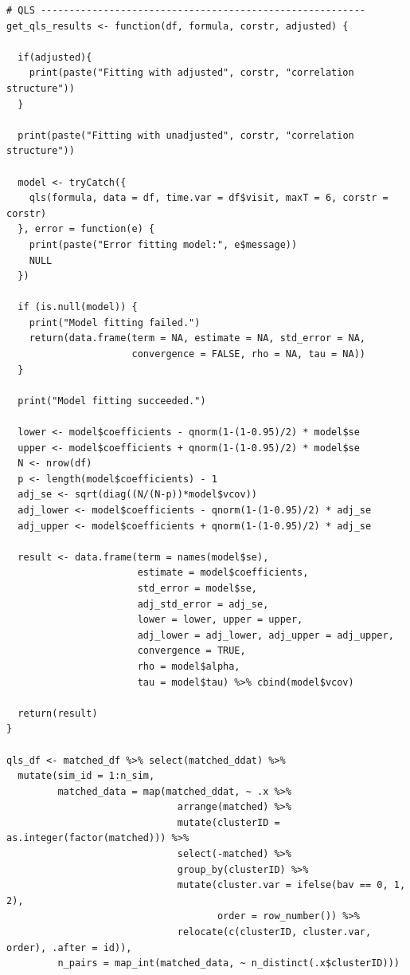 \documentclass[
]{aft}
\begin{document}
\begin{verbatim}
# QLS ---------------------------------------------------------
get_qls_results <- function(df, formula, corstr, adjusted) {
  
  if(adjusted){
    print(paste("Fitting with adjusted", corstr, "correlation structure"))
  }
  
  print(paste("Fitting with unadjusted", corstr, "correlation structure"))
  
  model <- tryCatch({
    qls(formula, data = df, time.var = df$visit, maxT = 6, corstr = corstr)
  }, error = function(e) {
    print(paste("Error fitting model:", e$message))
    NULL
  })
  
  if (is.null(model)) {
    print("Model fitting failed.")
    return(data.frame(term = NA, estimate = NA, std_error = NA, 
                      convergence = FALSE, rho = NA, tau = NA))
  }
  
  print("Model fitting succeeded.")
  
  lower <- model$coefficients - qnorm(1-(1-0.95)/2) * model$se
  upper <- model$coefficients + qnorm(1-(1-0.95)/2) * model$se
  N <- nrow(df)
  p <- length(model$coefficients) - 1
  adj_se <- sqrt(diag((N/(N-p))*model$vcov))
  adj_lower <- model$coefficients - qnorm(1-(1-0.95)/2) * adj_se
  adj_upper <- model$coefficients + qnorm(1-(1-0.95)/2) * adj_se
  
  result <- data.frame(term = names(model$se), 
                       estimate = model$coefficients, 
                       std_error = model$se, 
                       adj_std_error = adj_se, 
                       lower = lower, upper = upper, 
                       adj_lower = adj_lower, adj_upper = adj_upper,
                       convergence = TRUE, 
                       rho = model$alpha,
                       tau = model$tau) %>% cbind(model$vcov)
  
  return(result)
}

qls_df <- matched_df %>% select(matched_ddat) %>%  
  mutate(sim_id = 1:n_sim, 
         matched_data = map(matched_ddat, ~ .x %>% 
                              arrange(matched) %>% 
                              mutate(clusterID = as.integer(factor(matched))) %>% 
                              select(-matched) %>% 
                              group_by(clusterID) %>% 
                              mutate(cluster.var = ifelse(bav == 0, 1, 2), 
                                     order = row_number()) %>% 
                              relocate(c(clusterID, cluster.var, order), .after = id)), 
         n_pairs = map_int(matched_data, ~ n_distinct(.x$clusterID)))



\end{verbatim}
\end{document}
